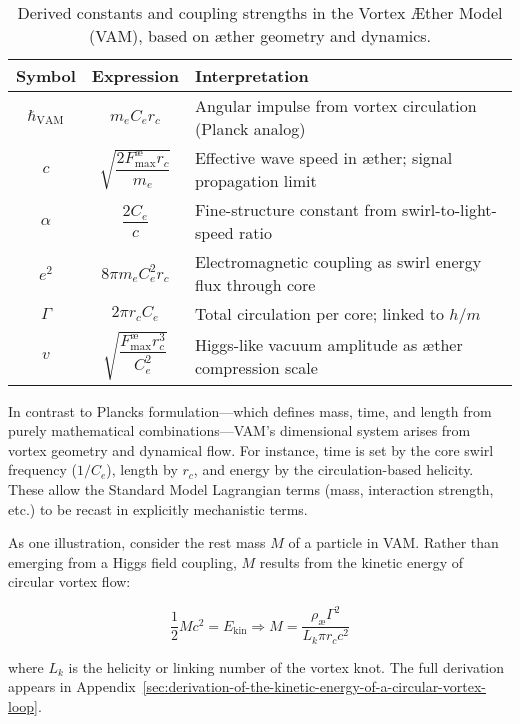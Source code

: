 \begin{table}[H]
    \centering
    \footnotesize
    \renewcommand{\arraystretch}{1.3}
    \begin{tabular}{|c|c|l|}
        \hline
        \textbf{Symbol} & \textbf{Expression} & \textbf{Interpretation} \\
        \hline
        $\hbar_\text{VAM}$ & $m_e C_e r_c$ & Angular impulse from vortex circulation (Planck analog) \\
        \hline
        $c$ & $\sqrt{\dfrac{2 F^{\text{\ae}}_{\text{max}} r_c}{m_e}}$ & Effective wave speed in æther; signal propagation limit \\
        \hline
        $\alpha$ & $\dfrac{2 C_e}{c}$ & Fine-structure constant from swirl-to-light-speed ratio \\
        \hline
        $e^2$ & $8\pi m_e C_e^2 r_c$ & Electromagnetic coupling as swirl energy flux through core \\
        \hline
        $\Gamma$ & $2\pi r_c C_e$ & Total circulation per core; linked to $h/m$ \\
        \hline
        $v$ & $\sqrt{\dfrac{F^{\text{\ae}}_{\text{max}} r_c^3}{C_e^2}}$ & Higgs-like vacuum amplitude as æther compression scale \\
        \hline
    \end{tabular}
    \caption{Derived constants and coupling strengths in the Vortex Æther Model (VAM), based on æther geometry and dynamics.}
    \label{tab:VAM_constants}
\end{table}

In contrast to Planck\rqs s formulation—which defines mass, time, and length from purely mathematical combinations—VAM's dimensional system arises from vortex geometry and dynamical flow. For instance, time is set by the core swirl frequency ($1/C_e$), length by $r_c$, and energy by the circulation-based helicity. These allow the Standard Model Lagrangian terms (mass, interaction strength, etc.) to be recast in explicitly mechanistic terms.

As one illustration, consider the rest mass $M$ of a particle in VAM. Rather than emerging from a Higgs field coupling, $M$ results from the kinetic energy of circular vortex flow:

\begin{equation}
    \frac{1}{2} M c^2 = E_\text{kin} \Rightarrow M = \frac{\rho_\text{\ae} \Gamma^2}{L_k \pi r_c c^2}
\end{equation}

where $L_k$ is the helicity or linking number of the vortex knot. The full derivation appears in Appendix~\ref{sec:derivation-of-the-kinetic-energy-of-a-circular-vortex-loop}.

